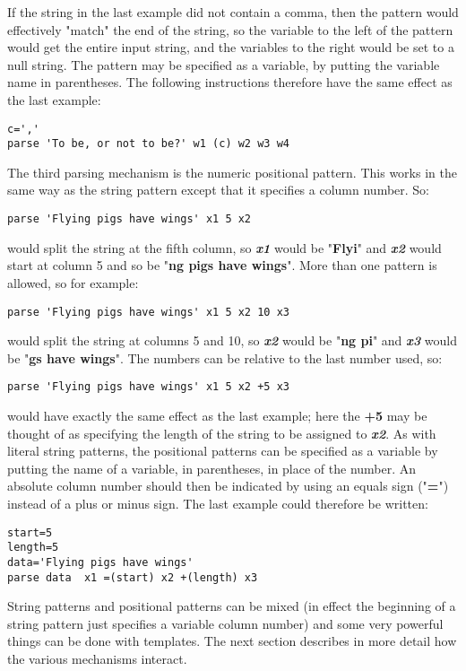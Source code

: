 If the string in the last example did not contain a comma, then
the pattern would effectively "match" the end of the string, so
the variable to the left of the pattern would get the entire input
string, and the variables to the right would be set to a null string.
 The pattern may be specified as a variable, by putting the variable
name in parentheses.  The following instructions therefore have the
same effect as the last example:
\begin{lstlisting}
c=','
parse 'To be, or not to be?' w1 (c) w2 w3 w4
\end{lstlisting}
 The third parsing mechanism is the numeric positional
pattern.
This works in the same way as the string pattern except that it
specifies a column number.  So:
\begin{lstlisting}
parse 'Flying pigs have wings' x1 5 x2
\end{lstlisting}
would split the string at the fifth column,
so \textbf{\emph{x1}} would be "\textbf{Flyi}"
and \textbf{\emph{x2}} would start at column 5 and
so be "\textbf{ng pigs have wings}".
 More than one pattern is allowed, so for example:
\begin{lstlisting}
parse 'Flying pigs have wings' x1 5 x2 10 x3
\end{lstlisting}
would split the string at columns 5 and 10,
so \textbf{\emph{x2}} would be
"\textbf{ng pi}" and \textbf{\emph{x3}} would be
"\textbf{gs have wings}".
 The numbers can be relative to the last number used, so:
\begin{lstlisting}
parse 'Flying pigs have wings' x1 5 x2 +5 x3
\end{lstlisting}
would have exactly the same effect as the last example; here
the \textbf{+5} may be thought of as specifying the length of the
string to be assigned to \textbf{\emph{x2}}.
 As with literal string patterns, the positional patterns can
be specified as a variable by putting the name of a variable, in
parentheses, in place of the number.
An absolute column number should then be indicated by using an equals
sign ("\textbf{=}") instead of a plus or minus sign.
The last example could therefore be written:
\begin{lstlisting}
start=5
length=5
data='Flying pigs have wings'
parse data  x1 =(start) x2 +(length) x3
\end{lstlisting}
 String patterns and positional patterns can be mixed (in effect the
beginning of a string pattern just specifies a variable column number)
and some very powerful things can be done with templates.
The next section describes in more detail how the various mechanisms
interact.
